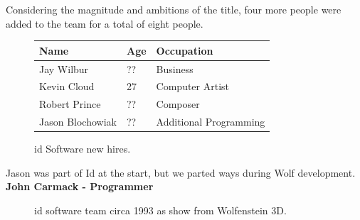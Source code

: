 \documentclass[book.tex]{subfiles}
\begin{document}
Considering the magnitude and ambitions of the title, four more people were added to the team for a total of eight people.\\

 \begin{figure}[H]
\centering  
\begin{tabularx}{\textwidth}{ X  X  X  }
  \toprule
  \textbf{Name} &  \textbf{Age} & \textbf{Occupation} \\
  \toprule 
   Jay Wilbur & ?? &  Business\\
   Kevin Cloud & 27 &  Computer Artist\\
   Robert Prince & ?? &  Composer\\
   Jason Blochowiak & ?? &  Additional Programming\\
     \toprule
\end{tabularx}
\caption{id Software new hires.}\label{fig:Id Software hires}
\end{figure}

\begin{fancyquotes}
Jason was part of Id at the start, but we parted ways during Wolf development.
 \bigskip \\
\textbf{John Carmack - Programmer}
 \end{fancyquotes}
 
\begin{figure}[H]
\centering
\caption{id software team circa 1993 as show from Wolfenstein 3D.}
\label{fig:id_team_1993}
\end{figure}
 
\end{document}
